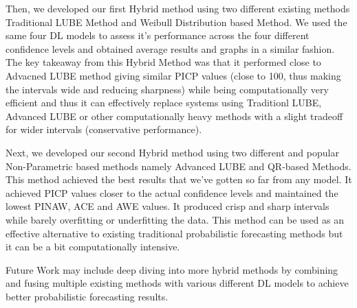 Then, we developed our first Hybrid method using two different existing methods Traditional LUBE Method and Weibull Distribution based Method. We used the same four DL models to assess it's performance across the four different confidence levels and obtained average results and graphs in a similar fashion. The key takeaway from this Hybrid Method was that it performed close to Advacned LUBE method giving similar PICP values (close to 100, thus making the intervals wide and reducing sharpness) while being computationally very efficient and thus it can effectively replace systems using Traditionl LUBE, Advanced LUBE or other computationally heavy methods with a slight tradeoff for wider intervals (conservative performance).

Next, we developed our second Hybrid method using two different and popular Non-Parametric based methods namely Advanced LUBE and QR-based Methods. This method achieved the best results that we've gotten so far from any model. It achieved PICP values closer to the actual confidence levels and maintained the lowest PINAW, ACE and AWE values. It produced crisp and sharp intervals while barely overfitting or underfitting the data. This method can be used as an effective alternative to existing traditional probabilistic forecasting methods but it can be a bit computationally intensive.

Future Work may include deep diving into more hybrid methods by combining and fusing multiple existing methods with various different DL models to achieve better probabilistic forecasting results.